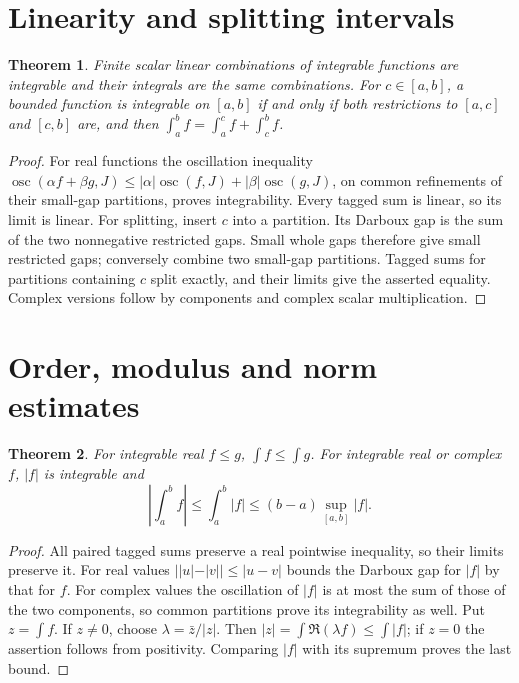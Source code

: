 \documentclass[11pt,oneside,a4paper]{book}
\newtheorem{theorem}{Theorem}[chapter]
\theoremstyle{definition}
\theoremstyle{remark}
\DeclareMathOperator{\osc}{osc}
\newcommand{\KEntry}[2]{\Needspace{7\baselineskip}\section{#2}\label{#1}{\small\sffamily\color{black!60}\detokenize{#1}}\par}
\begin{document}
\KEntry{K03.08.linearity}{Linearity and splitting intervals}
\begin{theorem}
Finite scalar linear combinations of integrable functions are integrable
and their integrals are the same combinations. For $c\in[a,b]$, a bounded
function is integrable on $[a,b]$ if and only if both restrictions to
$[a,c]$ and $[c,b]$ are, and then
$\int_a^bf=\int_a^cf+\int_c^bf$.
\end{theorem}
\begin{proof}
For real functions the oscillation inequality
$\osc(\alpha f+\beta g,J)\le|\alpha|\osc(f,J)+|\beta|\osc(g,J)$,
on common refinements of their small-gap partitions, proves integrability.
Every tagged sum is linear, so its limit is linear. For splitting, insert
$c$ into a partition. Its Darboux gap is the sum of the two nonnegative
restricted gaps. Small whole gaps therefore give small restricted gaps;
conversely combine two small-gap partitions. Tagged sums for partitions
containing $c$ split exactly, and their limits give the asserted equality.
Complex versions follow by components and complex scalar multiplication.
\end{proof}

\KEntry{K03.08.order}{Order, modulus and norm estimates}
\begin{theorem}
For integrable real $f\le g$, $\int f\le\int g$. For integrable real
or complex $f$, $|f|$ is integrable and
\[\left|\int_a^bf\right|\le\int_a^b|f|\le(b-a)\sup_{[a,b]}|f|.
\]
\end{theorem}
\begin{proof}
All paired tagged sums preserve a real pointwise inequality, so their
limits preserve it. For real values $||u|-|v||\le|u-v|$ bounds the
Darboux gap for $|f|$ by that for $f$. For complex values the oscillation
of $|f|$ is at most the sum of those of the two components, so common
partitions prove its integrability as well. Put $z=\int f$. If $z\ne0$,
choose $\lambda=\bar z/|z|$. Then
$|z|=\int\Re(\lambda f)\le\int|f|$; if $z=0$ the assertion follows
from positivity. Comparing $|f|$ with its supremum proves the last bound.
\end{proof}
\end{document}
